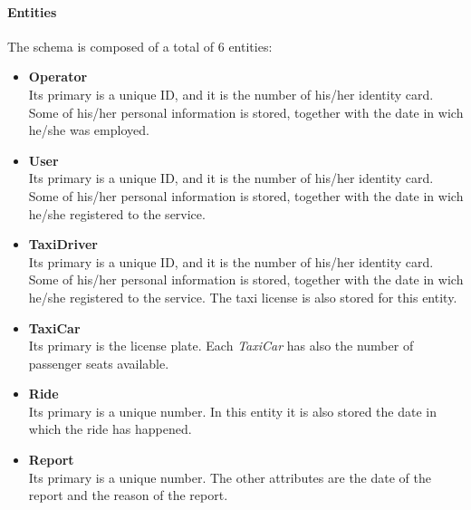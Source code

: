 \paragraph{Entities} %
\label{par:entities}
The schema is composed of a total of 6 entities:

\begin{itemize}
	\item {\textbf{Operator}} \\
		Its primary is a unique ID, and it is the number of his/her identity card.
		Some of his/her personal information is stored, together with the date in wich he/she was employed.
	\item {\textbf{User}} \\
		Its primary is a unique ID, and it is the number of his/her identity card.
		Some of his/her personal information is stored, together with the date in wich he/she registered to the service.
	\item {\textbf{TaxiDriver}} \\
		Its primary is a unique ID, and it is the number of his/her identity card.
		Some of his/her personal information is stored, together with the date in wich he/she registered to the service.
		The taxi license is also stored for this entity.
	\item {\textbf{TaxiCar}} \\
		Its primary is the license plate. Each \emph{TaxiCar} has also the number of passenger seats available.
	\item {\textbf{Ride}} \\
		Its primary is a unique number. In this entity it is also stored the date in which the ride has happened.
	\item {\textbf{Report}} \\
		Its primary is a unique number. The other attributes are the date of the report and the reason of the report.
\end{itemize}


\newpage
